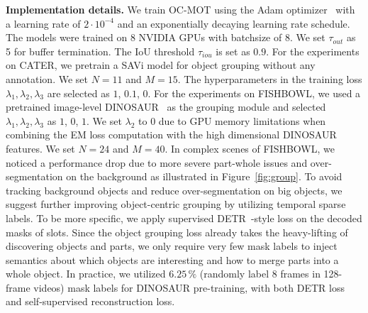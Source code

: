 \vspace{+2.5mm}
\noindent\textbf{Implementation details.} We train OC-MOT using the Adam optimizer~\cite{kingma2014adam} with a learning rate of $2\cdot10^{-4}$ and an exponentially decaying learning rate schedule. The models were trained on 8 NVIDIA GPUs with batchsize of 8. We set $\tau_{out}$ as 5 for buffer termination.
The IoU threshold $\tau_{iou}$ is set as $0.9$. For the experiments on CATER, we pretrain a SAVi model for object grouping without any annotation. We set $N=11$ and $M=15$.
The hyperparameters in the training loss  $\lambda_1, \lambda_2, \lambda_3$ are selected as $1$, $0.1$, $0$. For the experiments on FISHBOWL, we used a pretrained image-level DINOSAUR~\cite{seitzer2022bridging} as the grouping module and selected  $\lambda_1, \lambda_2, \lambda_3$ as $1$, $0$, $1$. We set $\lambda_2$ to $0$ due to GPU memory limitations when combining the EM loss computation with the high dimensional DINOSAUR features. We set $N= 24$ and $M=40$. In complex scenes of FISHBOWL, we noticed a performance drop due to more severe part-whole issues and over-segmentation on the background as illustrated in Figure~\ref{fig:group}. To avoid tracking background objects and reduce over-segmentation on big objects, we suggest further improving object-centric grouping by utilizing temporal sparse labels. To be more specific, we apply supervised DETR~\cite{carion2020end}-style loss on the decoded masks of slots. Since the object grouping loss already takes the heavy-lifting of discovering objects and parts, we only require very few mask labels to inject semantics about which objects are interesting and how to merge parts into a whole object. In practice, we utilized $6.25\,\%$ (randomly label 8 frames in 128-frame videos) mask labels for DINOSAUR pre-training, with both DETR loss and self-supervised reconstruction loss.  



\begin{table}[!ht]
\centering
{}
\vspace{+0.05in}
\caption{Comparisons with video object-centric models on CATER. Note that FG-ARI~\cite{kipf2022conditional} is a commonly used OC metric.}
	\label{tab:results_cater}
\end{table}

